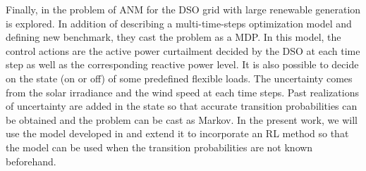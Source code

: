 Finally, in \cite{Gemine} the problem of ANM for the DSO grid with large renewable generation is explored.
In addition of describing a multi-time-steps optimization model and defining new benchmark, they cast the problem as a MDP.
In this model, the control actions are the active power curtailment decided by the DSO at each time step as well as the corresponding reactive power level.
It is also possible to decide on the state (on or off) of some predefined flexible loads.
The uncertainty comes from the solar irradiance and the wind speed at each time steps.
Past realizations of uncertainty are added in the state so that accurate transition probabilities can be obtained and the problem can be cast as Markov.
In the present work, we will use the model developed in \cite{Gemine} and extend it to incorporate an RL method so that the model can be used when the transition probabilities are not known beforehand.
